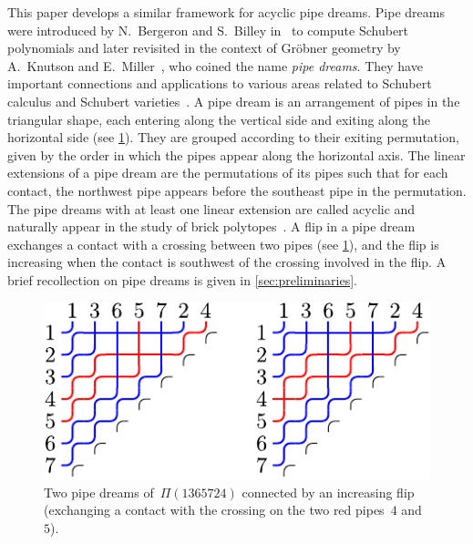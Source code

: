 \documentclass[reqno]{amsart}
\theoremstyle{definition}
\newcommand{\pipeDreams}{\Pi} %
\begin{document}
This paper develops a similar framework for acyclic pipe dreams.
Pipe dreams were introduced by N.~Bergeron and S.~Billey in~\cite{BergeronBilley} to compute Schubert polynomials and later revisited in the context of Gr\"obner geometry by A.~Knutson and E.~Miller~\cite{KnutsonMiller-GroebnerGeometry}, who coined the name \emph{pipe dreams}.
They have important connections and applications to various areas related to Schubert calculus and Schubert varieties~\cite{LascouxSchutzenberger-PolynomesSchubert, LascouxSchutzenberger-SchubertLittlewoudRichardson}. 
A pipe dream is an arrangement of pipes in the triangular shape, each entering along the vertical side and exiting along the horizontal side (see \cref{fig:pipeDreams}).
They are grouped according to their exiting permutation, given by the order in which the pipes appear along the horizontal axis.
The linear extensions of a pipe dream are the permutations of its pipes such that for each contact, the northwest pipe appears before the southeast pipe in the permutation.
The pipe dreams with at least one linear extension are called acyclic and naturally appear in the study of brick polytopes~\cite{PilaudSantos-brickPolytope}.
A flip in a pipe dream exchanges a contact with a crossing between two pipes (see \cref{fig:pipeDreams}), and the flip is increasing when the contact is southwest of the crossing involved in the flip.
A brief recollection on pipe dreams is given in \cref{sec:preliminaries}.

\begin{figure}[t]
	\centerline{
		\includegraphics[scale=.9]{pipeDreams}
	}
	\caption{Two pipe dreams of~$\pipeDreams(1365724)$ connected by an increasing flip (exchanging a contact with the crossing on the two red pipes~$4$ and~$5$).}
	\label{fig:pipeDreams}
\end{figure}
\end{document}

